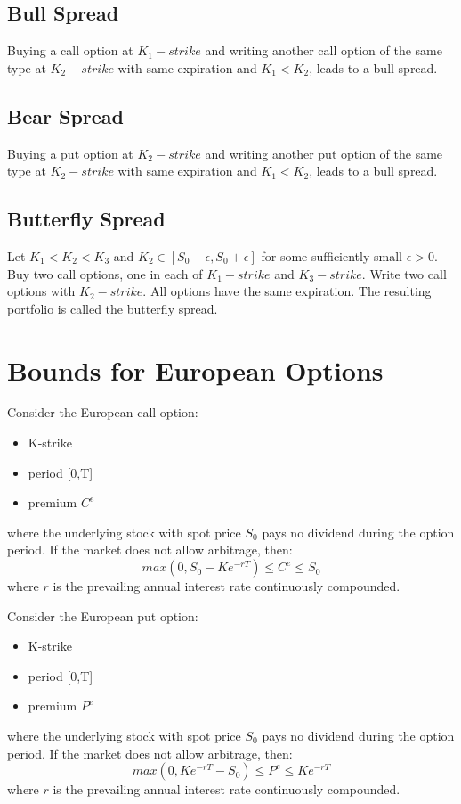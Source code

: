 \documentclass{report}
\begin{document}
\subsection{Bull Spread}
Buying a call option at $K_1 - strike$ and writing another call option of the same type at $K_2-strike$ with same expiration and $K_1 < K_2$, leads to a bull spread.

\subsection{Bear Spread}
Buying a put option at $K_2 - strike$ and writing another put option of the same type at $K_2-strike$ with same expiration and $K_1 < K_2$, leads to a bull spread.

\subsection{Butterfly Spread}
Let $K_1 < K_2 < K_3$ and $K_2 \in [S_0-\epsilon, S_0+\epsilon]$ for some sufficiently small $\epsilon > 0$. Buy two call options, one in each of $K_1-strike$ and $K_3-strike$. Write two call options with $K_2-strike$. All options have the same expiration. The resulting portfolio is called the butterfly spread.


\section{Bounds for European Options}
Consider the European call option:
\begin{itemize}
    \item K-strike
    \item period [0,T]
    \item premium $C^e$
\end{itemize}

where the underlying stock with spot price $S_0$ pays no dividend during the option period. If the market does not allow arbitrage, then:
\[max(0, S_0-Ke^{-rT}) \leq C^e \leq S_0\]
where $r$ is the prevailing annual interest rate continuously compounded.


Consider the European put option:
\begin{itemize}
    \item K-strike
    \item period [0,T]
    \item premium $P^e$
\end{itemize}

where the underlying stock with spot price $S_0$ pays no dividend during the option period. If the market does not allow arbitrage, then:
\[max(0, Ke^{-rT}-S_0) \leq P^e \leq Ke^{-rT}\]
where $r$ is the prevailing annual interest rate continuously compounded.
\end{document}
